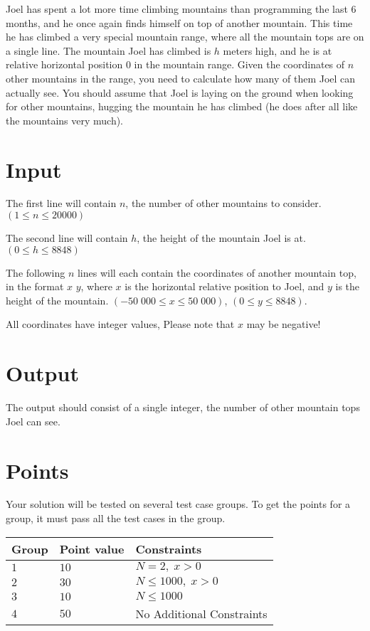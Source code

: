 \noindent

Joel has spent a lot more time climbing mountains than programming the last 6 months, and he once again finds himself on top of another mountain.
This time he has climbed a very special mountain range, where all the mountain tops are on a single line. 
The mountain Joel has climbed is $h$ meters high, and he is at relative horizontal position 0 in the mountain range.
Given the coordinates of $n$ other mountains in the range, you need to calculate how many of them Joel can actually see.
You should assume that Joel is laying on the ground when looking for other mountains, hugging the mountain he has climbed (he does after all like the mountains very much).

\section*{Input}
The first line will contain $n$, the number of other mountains to consider. $(1 \leq n \leq 20000)$

The second line will contain $h$, the height of the mountain Joel is at. $(0 \leq h \leq 8848)$

The following $n$ lines will each contain the coordinates of another mountain top, in the format $x$ $y$, where $x$ is the horizontal relative position to Joel,
and $y$ is the height of the mountain. $(-50\;000 \leq x \leq 50\;000)$, $(0 \leq y \leq 8848)$.

All coordinates have integer values, Please note that $x$ may be negative!

\section*{Output}
The output should consist of a single integer, the number of other mountain tops Joel can see.

\section*{Points}
Your solution will be tested on several test case groups. To get the points for
a group, it must pass all the test cases in the group.

\noindent
\begin{tabular}{| l | l | p{12cm} |}
  \hline
  \textbf{Group} & \textbf{Point value} & \textbf{Constraints} \\ \hline
  $1$    & $10$       & $N = 2,\;x > 0$ \\ \hline
  $2$    & $30$       & $N \leq 1000,\;x > 0$ \\ \hline
  $3$    & $10$       & $N \leq 1000$ \\ \hline
  $4$    & $50$       & No Additional Constraints \\ \hline
\end{tabular}




